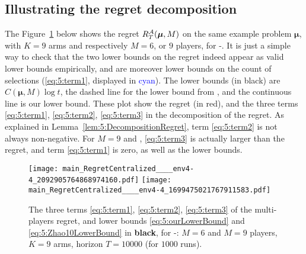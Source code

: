 \subsection*{Illustrating the regret decomposition}
\label{app:5:illustrationRegretDecomposition}

The Figure~\ref{fig:5:MP__M9_K9_T10000_N1000__9_algos__main_RegretCentralized____env6} below
shows the regret $R_T^{\mathcal{A}}(\boldsymbol{\mu}, M)$
on the same example problem $\boldsymbol{\mu}$, with $K = 9$ arms and respectively $M = 6$, or $9$ players, for \Selfish-\klUCB.
%
It is just a simple way to check that the two lower bounds on the regret indeed appear as valid lower bounds empirically,
and are moreover lower bounds on the count of selections (\ref{eq:5:term1}, displayed in \textcolor{blue}{cyan}).
%
The lower bounds (in black) are $C(\boldsymbol{\mu}, M) \log t$, the dashed line
for the lower bound from \cite{Zhao10}, and the continuous line is our lower bound.
%
These plot show the regret (in red),
and the three terms \ref{eq:5:term1}, \ref{eq:5:term2}, \ref{eq:5:term3} in the decomposition of the regret.
As explained in Lemma~\ref{lem:5:DecompositionRegret}, term \ref{eq:5:term2} is not always non-negative.
For $M=9$ and \Selfish, \ref{eq:5:term3} is actually larger than the regret,
and term \ref{eq:5:term1} is zero, as well as the lower bounds.


%
%
\begin{figure}[!h]
    \centering
        \texttt{[image: main\_RegretCentralized\_\_\_\_env4-4\_2092905764868974160.pdf]}
        \texttt{[image: main\_RegretCentralized\_\_\_\_env4-4\_1699475021767911583.pdf]}
    \caption[Illustrating the decomposition of the multi-players regret with its three terms.]{The three terms \ref{eq:5:term1}, \ref{eq:5:term2}, \ref{eq:5:term3} of the multi-players regret, and lower bounds \eqref{eq:5:ourLowerBound} and \eqref{eq:5:Zhao10LowerBound} in \textbf{black}, for \Selfish-\klUCB: $M=6$ and $M=9$ players, $K=9$ arms, horizon $T=10000$ (for $1000$ runs).}
    \label{fig:5:MP__M9_K9_T10000_N1000__9_algos__main_RegretCentralized____env6}
\end{figure}



